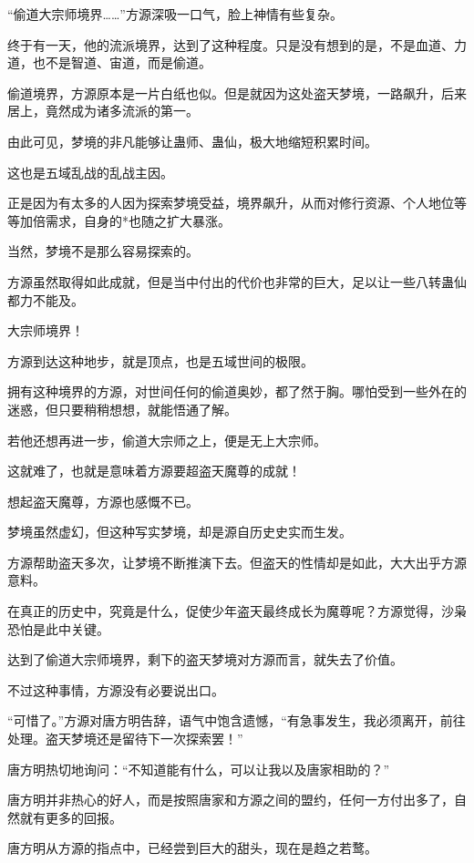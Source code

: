 
\begin{this_body}

“偷道大宗师境界……”方源深吸一口气，脸上神情有些复杂。

终于有一天，他的流派境界，达到了这种程度。只是没有想到的是，不是血道、力道，也不是智道、宙道，而是偷道。

偷道境界，方源原本是一片白纸也似。但是就因为这处盗天梦境，一路飙升，后来居上，竟然成为诸多流派的第一。

由此可见，梦境的非凡能够让蛊师、蛊仙，极大地缩短积累时间。

这也是五域乱战的乱战主因。

正是因为有太多的人因为探索梦境受益，境界飙升，从而对修行资源、个人地位等等加倍需求，自身的*也随之扩大暴涨。

当然，梦境不是那么容易探索的。

方源虽然取得如此成就，但是当中付出的代价也非常的巨大，足以让一些八转蛊仙都力不能及。

大宗师境界！

方源到达这种地步，就是顶点，也是五域世间的极限。

拥有这种境界的方源，对世间任何的偷道奥妙，都了然于胸。哪怕受到一些外在的迷惑，但只要稍稍想想，就能悟通了解。

若他还想再进一步，偷道大宗师之上，便是无上大宗师。

这就难了，也就是意味着方源要超盗天魔尊的成就！

想起盗天魔尊，方源也感慨不已。

梦境虽然虚幻，但这种写实梦境，却是源自历史史实而生发。

方源帮助盗天多次，让梦境不断推演下去。但盗天的性情却是如此，大大出乎方源意料。

在真正的历史中，究竟是什么，促使少年盗天最终成长为魔尊呢？方源觉得，沙枭恐怕是此中关键。

达到了偷道大宗师境界，剩下的盗天梦境对方源而言，就失去了价值。

不过这种事情，方源没有必要说出口。

“可惜了。”方源对唐方明告辞，语气中饱含遗憾，“有急事发生，我必须离开，前往处理。盗天梦境还是留待下一次探索罢！”

唐方明热切地询问：“不知道能有什么，可以让我以及唐家相助的？”

唐方明并非热心的好人，而是按照唐家和方源之间的盟约，任何一方付出多了，自然就有更多的回报。

唐方明从方源的指点中，已经尝到巨大的甜头，现在是趋之若鹜。


\end{this_body}
